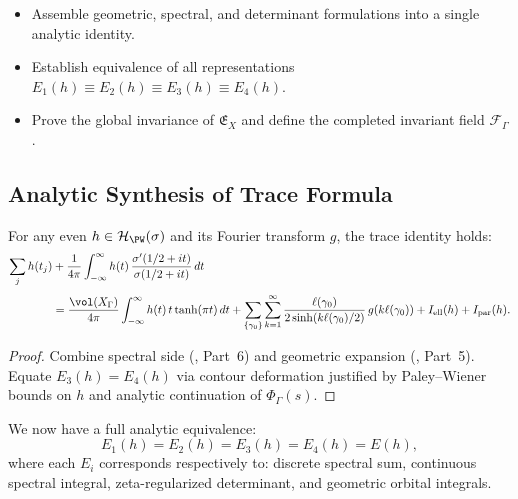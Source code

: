 \begin{tcolorbox}[colback=gray!4,colframe=gray!45,title={Scope • Synthesis and Closure of Invariants}] %
\begin{itemize}
  \item Assemble geometric, spectral, and determinant formulations into a single analytic identity. %
  \item Establish equivalence of all representations $E_1(h)\equiv E_2(h)\equiv E_3(h)\equiv E_4(h)$. %
  \item Prove the global invariance of $\mathfrak{E}_X$ and define the completed invariant field $\mathcal{F}_\Gamma$. %
\end{itemize}
\end{tcolorbox}

\subsection{Analytic Synthesis of Trace Formula}\relax\hspace{0pt}
\label{subsec:analytic-synthesis}\relax\hspace{0pt}

\begin{theorem}\label{thm:selberg-analytic}\relax
For any even $h\in\mathcal{H}_{\PW}(\sigma)$ and its Fourier transform $g$, the trace identity holds:
\begin{align*}
\sum_j h(t_j) 
&+ \frac{1}{4\pi}\int_{-\infty}^{\infty} h(t)\,\frac{\sigma'(1/2+it)}{\sigma(1/2+it)}\,dt \\[3pt]
&= \frac{\vol(X_\Gamma)}{4\pi}\int_{-\infty}^{\infty} h(t)\,t\tanh(\pi t)\,dt
 + \sum_{\{\gamma_0\}}\sum_{k=1}^\infty \frac{\ell(\gamma_0)}{2\sinh(k\ell(\gamma_0)/2)}\,g(k\ell(\gamma_0))
 + I_{\mathrm{ell}}(h)+I_{\mathrm{par}}(h).
\end{align*}
\end{theorem}

\begin{proof}\relax
Combine spectral side (, Part~6) and geometric expansion (, Part~5).  
Equate $E_3(h)=E_4(h)$ via contour deformation justified by Paley–Wiener bounds on $h$ and analytic continuation of $\Phi_\Gamma(s)$. %
\end{proof}

\begin{remark}\label{rem:eq-chain}\relax
We now have a full analytic equivalence:
\[
E_1(h)=E_2(h)=E_3(h)=E_4(h)=E(h),
\]
where each $E_i$ corresponds respectively to: discrete spectral sum, continuous spectral integral, zeta-regularized determinant, and geometric orbital integrals. %
\end{remark}

